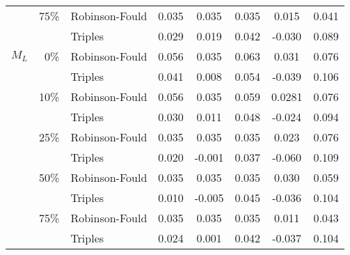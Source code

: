 \begin{tabular}{rrlccccc}
              & 75\%         & Robinson-Fould & 0.035 & 0.035  & 0.035 & 0.015   & 0.041 \\
              &              & Triples        & 0.029 & 0.019  & 0.042 & -0.030  & 0.089 \\   
    $M_L$     & 0\%          & Robinson-Fould & 0.056 & 0.035  & 0.063 & 0.031   & 0.076 \\
              &              & Triples        & 0.041 & 0.008  & 0.054 & -0.039  & 0.106 \\
              & 10\%         & Robinson-Fould & 0.056 & 0.035  & 0.059 & 0.0281  & 0.076 \\
              &              & Triples        & 0.030 & 0.011  & 0.048 & -0.024  & 0.094 \\
              & 25\%         & Robinson-Fould & 0.035 & 0.035  & 0.035 & 0.023   & 0.076 \\
              &              & Triples        & 0.020 & -0.001 & 0.037 & -0.060  & 0.109 \\
              & 50\%         & Robinson-Fould & 0.035 & 0.035  & 0.035 & 0.030   & 0.059 \\
              &              & Triples        & 0.010 & -0.005 & 0.045 & -0.036  & 0.104 \\
              & 75\%         & Robinson-Fould & 0.035 & 0.035  & 0.035 & 0.011   & 0.043 \\
              &              & Triples        & 0.024 & 0.001  & 0.042 & -0.037  & 0.104 \\
    \hline
\end{tabular}